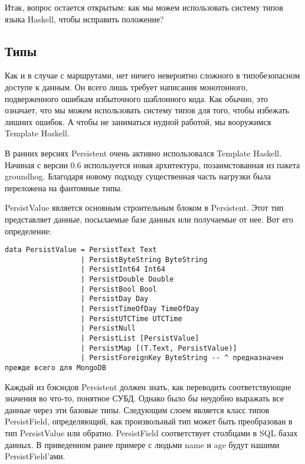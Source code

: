 Итак, вопрос остается открытым: как мы можем использовать систему типов языка Haskell, чтобы исправить положение?

\subsection{Типы} %

Как и в случае с маршрутами, нет ничего невероятно сложного в типобезопасном доступе к данным. Он всего лишь требует написания монотонного, подверженного ошибкам избыточного шаблонного кода. Как обычно, это означает, что мы можем использовать систему типов для того, чтобы избежать лишних ошибок. А чтобы не заниматься нудной работой, мы вооружимся Template Haskell.

\begin{remark}
В ранних версиях Persistent очень активно использовался Template Haskell. Начиная с версии 0.6 используется новая архитектура, позаимстованная из пакета groundhog. Благодаря новому подходу существенная часть нагрузки была переложена на фантомные типы.
\end{remark}

PersistValue является основным строительным блоком в Persistent. Этот тип представляет данные, посылаемые базе данных или получаемые от нее. Вот его определение:

\begin{lstlisting}
data PersistValue = PersistText Text
                  | PersistByteString ByteString
                  | PersistInt64 Int64
                  | PersistDouble Double
                  | PersistBool Bool
                  | PersistDay Day
                  | PersistTimeOfDay TimeOfDay
                  | PersistUTCTime UTCTime
                  | PersistNull
                  | PersistList [PersistValue]
                  | PersistMap [(T.Text, PersistValue)]
                  | PersistForeignKey ByteString -- ^ предназначен прежде всего для MongoDB
\end{lstlisting}

Каждый из бэкэндов Persistent должен знать, как переводить соответствующие значения во что-то, понятное СУБД. Однако было бы неудобно выражать все данные через эти базовые типы. Следующим слоем является класс типов PersistField, определяющий, как произвольный тип может быть преобразован в тип PersistValue или обратно. PersistField соответствует столбцами в SQL базах данных. В приведенном ранее примере с людьми name и age будут нашими PersistField'ами.

